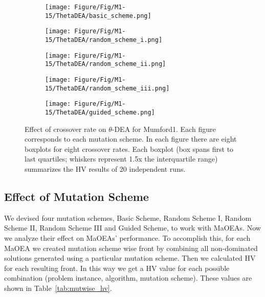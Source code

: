 \begin{figure}[!htbp]
	\centering
	\begin{subfigure}[b]{0.52\textwidth}
		\texttt{[image: Figure/Fig/M1-15/ThetaDEA/basic\_scheme.png]}
	\end{subfigure}%
	\begin{subfigure}[b]{0.52\textwidth}
		\texttt{[image: Figure/Fig/M1-15/ThetaDEA/random\_scheme\_i.png]}
	\end{subfigure}%
	\newline
	\begin{subfigure}[b]{0.52\textwidth}
		\texttt{[image: Figure/Fig/M1-15/ThetaDEA/random\_scheme\_ii.png]}
	\end{subfigure}%
	\begin{subfigure}[b]{0.52\textwidth}
		\texttt{[image: Figure/Fig/M1-15/ThetaDEA/random\_scheme\_iii.png]}
	\end{subfigure}%
	\newline
	\begin{subfigure}[b]{0.52\textwidth}
		\texttt{[image: Figure/Fig/M1-15/ThetaDEA/guided\_scheme.png]}
	\end{subfigure}%
	\caption{Effect of crossover rate on $\theta$-DEA for Mumford1. Each figure corresponds to each mutation scheme. In each figure there are eight boxplots for eight crossover rates.  Each boxplot (box spans first to last quartiles; whiskers represent 1.5x the interquartile range) summarizes the HV results of 20 independent runs.}
	\label{fig:cr_m1_thetadea}
\end{figure}

\subsection{Effect of Mutation Scheme}
We devised four mutation schemes, Basic Scheme, Random Scheme I, Random Scheme II, Random Scheme III and Guided Scheme, to work with MaOEAs. Now we analyze their effect on MaOEAs' performance. To accomplish this, for each MaOEA we created mutation scheme wise front by combining all non-dominated solutions generated using a particular mutation scheme. Then we calculated HV for each resulting front. In this way we get a HV value for each possible combination (problem instance, algorithm, mutation scheme). These values are shown in Table~\ref{tab:mutwise_hv}. 

